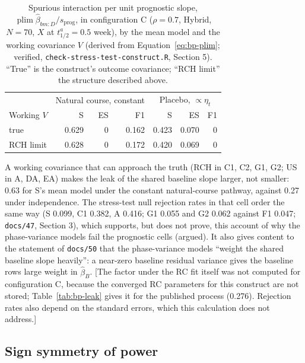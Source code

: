 \documentclass[11pt]{article}
\newcommand{\note}[1]{\textcolor{blue!60!black}{\small [#1]}}
\newcommand{\code}[1]{\texttt{#1}}
\begin{document}
\begin{table}[h]
\centering\small
\caption{Spurious interaction per unit prognostic slope,
$\operatorname{plim}\hat\beta_{bm:D}/s_{\mathrm{prog}}$, in
configuration C ($\rho = 0.7$, Hybrid, $N = 70$, $X$ at
$t^{a}_{1/2} = 0.5$ week), by the mean model and the working covariance
$V$ (derived from Equation~\eqref{eq:bp-plim}; verified,
\code{check-stress-test-construct.R}, Section 5). ``True'' is the construct's
outcome covariance; ``RCH limit'' the structure described above.}
\label{tab:invd-leakC}
\begin{tabular}{@{}lrrrrrr@{}}
\toprule
 & \multicolumn{3}{c}{Natural course, constant} &
   \multicolumn{3}{c}{Placebo, $\propto\eta_t$} \\
Working $V$ & S & ES & F1 & S & ES & F1 \\
\midrule
true         & 0.629 & 0 & 0.162 & 0.423 & 0.070 & 0 \\
RCH limit    & 0.628 & 0 & 0.172 & 0.420 & 0.069 & 0 \\
\bottomrule
\end{tabular}
\end{table}

\noindent A working covariance that can approach the truth (RCH in C1,
C2, G1, G2; US in A, DA, EA) makes the leak of the shared baseline
slope larger, not smaller: 0.63 for S's mean model under the
constant natural-course pathway, against 0.27 under independence. The
stress-test null rejection rates in that cell order the same way (S
0.099, C1 0.382, A 0.416; G1 0.055 and G2 0.062 against F1 0.047;
\code{docs/47}, Section 3), which supports, but does not prove, this
account of why the phase-variance models fail the prognostic cells
(argued). It also gives content to the statement of \code{docs/50} that
the phase-variance models ``weight the shared baseline slope heavily'':
a near-zero baseline residual variance gives the baseline rows large
weight in $\hat\beta_B$. \note{The factor under the RC fit itself was
not computed for configuration C, because the converged RC parameters
for this construct are not stored; Table~\ref{tab:bp-leak} gives it for
the published process (0.276). Rejection rates also depend on the
standard errors, which this calculation does not address.}

\subsection{Sign symmetry of power}
\label{sec:invd-symmetry}
\end{document}
